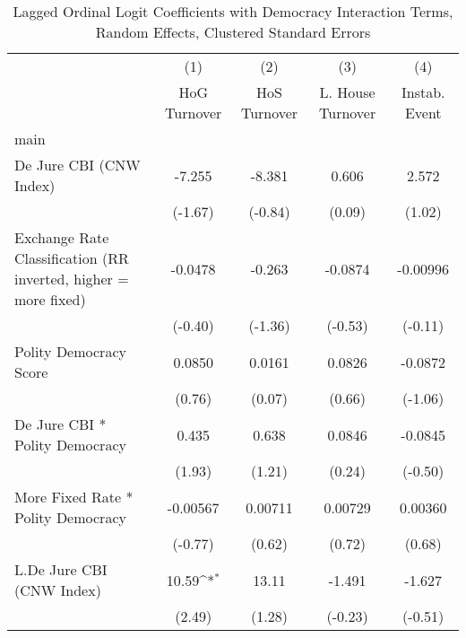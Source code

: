 {
\def\sym#1{\ifmmode^{#1}\else\(^{#1}\)\fi}
\begin{longtable}{l*{4}{c}}
\caption{Lagged Ordinal Logit Coefficients with Democracy Interaction Terms, Random Effects, Clustered Standard Errors \label{demintlagordLogLogDJ}}\\
\hline\hline\endfirsthead\hline\endhead\hline\endfoot\endlastfoot
                &\multicolumn{1}{c}{(1)}&\multicolumn{1}{c}{(2)}&\multicolumn{1}{c}{(3)}&\multicolumn{1}{c}{(4)}\\
                &\multicolumn{1}{c}{HoG Turnover}&\multicolumn{1}{c}{HoS Turnover}&\multicolumn{1}{c}{L. House Turnover}&\multicolumn{1}{c}{Instab. Event}\\
\hline
main            &                  &                  &                  &                  \\
De Jure CBI (CNW Index)&   -7.255         &   -8.381         &    0.606         &    2.572         \\
                &  (-1.67)         &  (-0.84)         &   (0.09)         &   (1.02)         \\
[1em]
Exchange Rate Classification (RR inverted, higher = more fixed)&  -0.0478         &   -0.263         &  -0.0874         & -0.00996         \\
                &  (-0.40)         &  (-1.36)         &  (-0.53)         &  (-0.11)         \\
[1em]
Polity Democracy Score&   0.0850         &   0.0161         &   0.0826         &  -0.0872         \\
                &   (0.76)         &   (0.07)         &   (0.66)         &  (-1.06)         \\
[1em]
De Jure CBI * Polity Democracy&    0.435         &    0.638         &   0.0846         &  -0.0845         \\
                &   (1.93)         &   (1.21)         &   (0.24)         &  (-0.50)         \\
[1em]
More Fixed Rate * Polity Democracy& -0.00567         &  0.00711         &  0.00729         &  0.00360         \\
                &  (-0.77)         &   (0.62)         &   (0.72)         &   (0.68)         \\
[1em]
L.De Jure CBI (CNW Index)&    10.59\sym{*}  &    13.11         &   -1.491         &   -1.627         \\
                &   (2.49)         &   (1.28)         &  (-0.23)         &  (-0.51)         \\

\end{longtable}}
